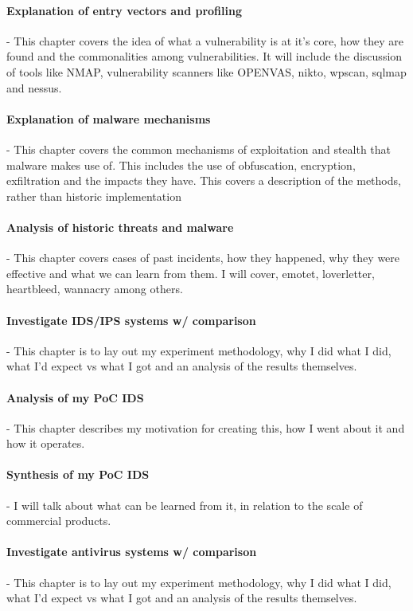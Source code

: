\paragraph{Explanation of entry vectors and profiling} - This chapter covers the idea of what a vulnerability is at it's core, how they are found
and the commonalities among vulnerabilities. It will include the discussion of tools like NMAP, vulnerability scanners like OPENVAS, nikto, wpscan, sqlmap and nessus.

\paragraph{Explanation of malware mechanisms} - This chapter covers the common mechanisms of exploitation and stealth that malware makes use of. 
This includes the use of obfuscation, encryption, exfiltration and the impacts they have. This covers a description of the methods, rather than historic implementation

\paragraph{Analysis of historic threats and malware} - This chapter covers cases of past incidents, how they happened, why they were effective and what we can learn from them.
I will cover, emotet, loverletter, heartbleed, wannacry among others.

\paragraph{Investigate IDS/IPS systems w/ comparison} - This chapter is to lay out my experiment methodology, why I did what I did, what I'd expect vs what I got and an analysis of the results themselves.

\paragraph{Analysis of my PoC IDS} - This chapter describes my motivation for creating this, how I went about it and how it operates. 

\paragraph{Synthesis of my PoC IDS} - I will talk about what can be learned from it, in relation to the scale of commercial products. 

\paragraph{Investigate antivirus systems w/ comparison} - This chapter is to lay out my experiment methodology, why I did what I did, what I'd expect vs what I got and an analysis of the results themselves.

